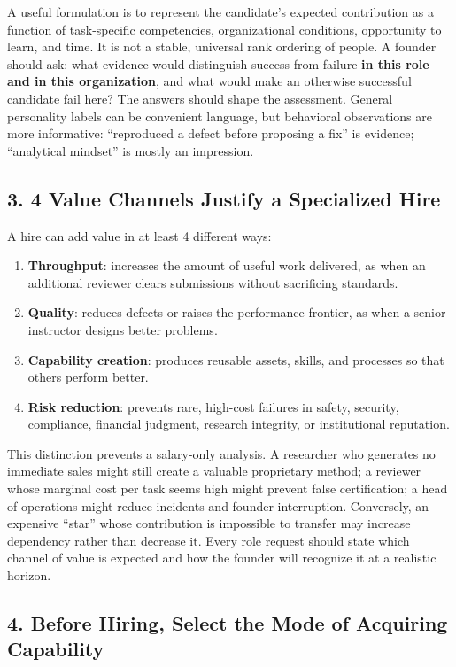 A useful formulation is to represent the candidate's expected contribution as a function of task-specific competencies, organizational conditions, opportunity to learn, and time. It is not a stable, universal rank ordering of people. A founder should ask: what evidence would distinguish success from failure \textbf{in this role and in this organization}, and what would make an otherwise successful candidate fail here? The answers should shape the assessment. General personality labels can be convenient language, but behavioral observations are more informative: ``reproduced a defect before proposing a fix'' is evidence; ``analytical mindset'' is mostly an impression.

\subsection*{3. 4 Value Channels Justify a Specialized Hire}

A hire can add value in at least 4 different ways:
\begin{enumerate}[leftmargin=*]
\item \textbf{Throughput}: increases the amount of useful work delivered, as when an additional reviewer clears submissions without sacrificing standards.
\item \textbf{Quality}: reduces defects or raises the performance frontier, as when a senior instructor designs better problems.
\item \textbf{Capability creation}: produces reusable assets, skills, and processes so that others perform better.
\item \textbf{Risk reduction}: prevents rare, high-cost failures in safety, security, compliance, financial judgment, research integrity, or institutional reputation.
\end{enumerate}

This distinction prevents a salary-only analysis. A researcher who generates no immediate sales might still create a valuable proprietary method; a reviewer whose marginal cost per task seems high might prevent false certification; a head of operations might reduce incidents and founder interruption. Conversely, an expensive ``star'' whose contribution is impossible to transfer may increase dependency rather than decrease it. Every role request should state which channel of value is expected and how the founder will recognize it at a realistic horizon.

\subsection*{4. Before Hiring, Select the Mode of Acquiring Capability}

